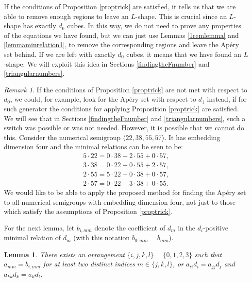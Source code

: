 \documentclass[12pt]{article}
\newtheorem{lemma}[thm]{Lemma}
\theoremstyle{remark}
\newtheorem{remark}[thm]{Remark}
\begin{document}
If the conditions of  Proposition \ref{proptrick} are satisfied, it tells us 
that we are able to remove enough regions to leave an $L$-shape. This is crucial since an $L$-shape has exactly $d_0$ cubes. In this way, we do not need to prove any properties of the equations we have found, but we can just use Lemmas \ref{1remlemma} and \ref{lemmaminrelation1}, to remove the corresponding regions and leave the Ap{\'e}ry set behind. If we are left with exactly $d_0$ cubes, it means that we have found an $L$-shape. We will exploit this idea in Sections \ref{findingtheFnumber} and \ref{triangularnumbers}.   

\begin{remark}
    If the conditions of Proposition \ref{proptrick} are not met with respect to $d_0$, we could, for example, look for the Ap{\'e}ry set with respect to $d_1$ instead, if for such generator the conditions for applying Proposition \ref{proptrick} are satisfied. We will see that in Sections \ref{findingtheFnumber} and \ref{triangularnumbers}, such a switch was possible or was not needed. However, it is possible that we cannot do this. Consider the numerical semigroup $\langle 22,38,55,57 \rangle$. It has embedding dimension four and the minimal relations can be seen to be: 
    \begin{align*}
        5 \cdot 22 = 0\cdot 38 + 2 \cdot 55 + 0\cdot57, \\
        3 \cdot 38 = 0\cdot 22 + 0\cdot 55 +2 \cdot 57, \\
        2 \cdot 55 = 5 \cdot 22 + 0\cdot 38 + 0\cdot 57,\\
        2 \cdot 57 = 0\cdot 22 +3 \cdot 38 + 0\cdot 55.
    \end{align*}
    We would like to be able to apply the proposed method for finding the Ap{\'e}ry set to all numerical semigroups with embedding dimension four, not just to those which satisfy the assumptions of Proposition \ref{proptrick}.
\end{remark}

For the next lemma, let $b_{i,mm}$ denote the coefficient of $d_m$ in the $d_i$-positive minimal relation of $d_m$ (with this notation $b_{0,mm} = b_{mm}$).

\begin{lemma}\label{lemma2cases}
     There exists an arrangement $\{i,j,k,l\} = \{0,1,2,3\}$ such that $a_{mm} = b_{i,mm}$ for at least two distinct indices $m \in \{j,k,l\}$, or $a_{ii}d_i = a_{jj}d_j$ and $a_{kk}d_k = a_{ll}d_l$.
\end{lemma}
\end{document}
